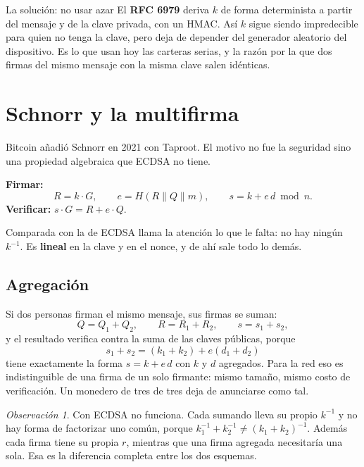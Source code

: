 \documentclass[11pt,a4paper]{article}
\theoremstyle{definition}
\theoremstyle{plain}
\theoremstyle{remark}
\newtheorem*{observacion}{Observación}
\begin{document}
\begin{clave}{La solución: no usar azar}
El \textbf{RFC 6979} deriva $k$ de forma determinista a partir del mensaje y de
la clave privada, con un HMAC. Así $k$ sigue siendo impredecible para quien no
tenga la clave, pero deja de depender del generador aleatorio del dispositivo.
Es lo que usan hoy las carteras serias, y la razón por la que dos firmas del
mismo mensaje con la misma clave salen idénticas.
\end{clave}

\section{Schnorr y la multifirma}\label{sec:schnorr}

Bitcoin añadió Schnorr en 2021 con Taproot. El motivo no fue la seguridad sino
una propiedad algebraica que ECDSA no tiene.

\textbf{Firmar:}
\[
  R = k\cdot G, \qquad e = H(R \parallel Q \parallel m), \qquad
  s = k + e\,d \bmod n.
\]
\textbf{Verificar:} $s\cdot G = R + e\cdot Q$.

Comparada con la de ECDSA llama la atención lo que le falta: no hay ningún
$k^{-1}$. Es \textbf{lineal} en la clave y en el nonce, y de ahí sale todo lo
demás.

\subsection{Agregación}

Si dos personas firman el mismo mensaje, sus firmas se suman:
\[
  Q = Q_1 + Q_2, \qquad R = R_1 + R_2, \qquad s = s_1 + s_2,
\]
y el resultado verifica contra la suma de las claves públicas, porque
\[
  s_1 + s_2 = (k_1 + k_2) + e(d_1 + d_2)
\]
tiene exactamente la forma $s = k + e\,d$ con $k$ y $d$ agregados. Para la red
eso es indistinguible de una firma de un solo firmante: mismo tamaño, mismo costo
de verificación. Un monedero de tres de tres deja de anunciarse como tal.

\begin{observacion}
Con ECDSA no funciona. Cada sumando lleva su propio $k^{-1}$ y no hay forma de
factorizar uno común, porque $k_1^{-1} + k_2^{-1} \ne (k_1+k_2)^{-1}$. Además
cada firma tiene su propia $r$, mientras que una firma agregada necesitaría una
sola. Esa es la diferencia completa entre los dos esquemas.
\end{observacion}
\end{document}
